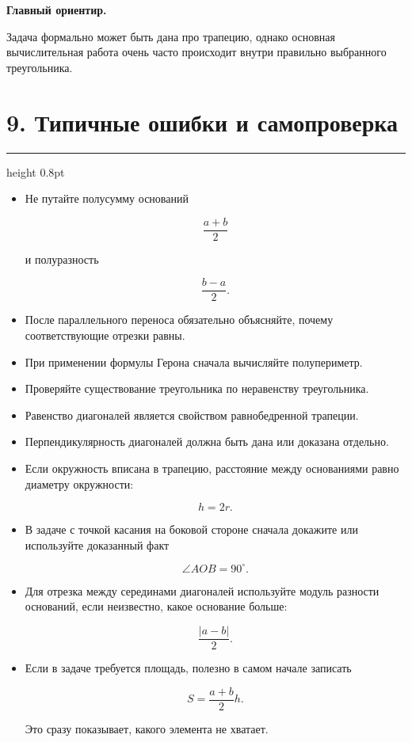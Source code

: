 \documentclass[a4paper,12pt]{article}
\newcommand{\sectionline}{
  \par
  \vspace{0.2em}
  {\color{accent}\hrule height 0.8pt}
  \vspace{0.7em}
}
\newcommand{\important}[1]{
  \textbf{\color{darkaccent}#1}
}
\begin{document}
\important{Главный ориентир.}
Задача формально может быть дана про трапецию, однако основная вычислительная
работа очень часто происходит внутри правильно выбранного треугольника.


\section*{9. Типичные ошибки и самопроверка}
\sectionline

\begin{itemize}

\item
Не путайте полусумму оснований

\[
\frac{a+b}{2}
\]

и полуразность

\[
\frac{b-a}{2}.
\]

\item
После параллельного переноса обязательно объясняйте, почему соответствующие
отрезки равны.

\item
При применении формулы Герона сначала вычисляйте полупериметр.

\item
Проверяйте существование треугольника по неравенству треугольника.

\item
Равенство диагоналей является свойством равнобедренной трапеции.

\item
Перпендикулярность диагоналей должна быть дана или доказана отдельно.

\item
Если окружность вписана в трапецию, расстояние между основаниями равно
диаметру окружности:

\[
h=2r.
\]

\item
В задаче с точкой касания на боковой стороне сначала докажите или используйте
доказанный факт

\[
\angle AOB=90^\circ.
\]

\item
Для отрезка между серединами диагоналей используйте модуль разности оснований,
если неизвестно, какое основание больше:

\[
\frac{|a-b|}{2}.
\]

\item
Если в задаче требуется площадь, полезно в самом начале записать

\[
S=\frac{a+b}{2}h.
\]

Это сразу показывает, какого элемента не хватает.

\end{itemize}
\end{document}
